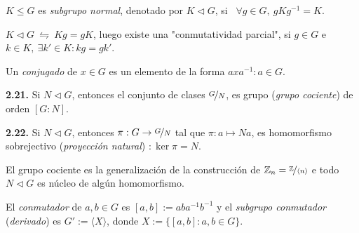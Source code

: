 \begin{definition}
    \(K\leq G\) es \emph{subgrupo normal}, denotado por \(K\lhd G\), si \ \(\forall g \in G, \ gKg^{-1} = K\).  
\end{definition}


\begin{note}
    \(K \lhd G \ \leftrightharpoons \ Kg = gK\), luego existe una "conmutatividad parcial", si \(g \in G\) e \(k \in K, \ \exists k' \in K : kg = gk'\). 
\end{note}

\begin{definition}
    Un \emph{conjugado} de \(x\in G\) es un elemento de la forma \(axa^{-1} : a \in G\). 
\end{definition}

\begin{theorem}
    \textbf{2.21.} Si \(N \lhd G\), entonces el conjunto de clases \(\nicefrac{G}{N}\), es grupo (\emph{grupo cociente}) de orden \([G:N]\). 
\end{theorem}

\begin{corollary}
    \textbf{2.22.} Si \(N \lhd G\), entonces \(\pi: G \to \nicefrac{G}{N}\) tal que \(\pi:  a\mapsto Na\), es homomorfismo sobrejectivo (\emph{proyección natural}) \(: \ker \pi = N\). 
\end{corollary}

\begin{note}
    El grupo cociente es la generalización de la construcción de \(\mathbb{Z}_n = \nicefrac{\mathbb{Z}}{\langle n \rangle}\) e todo \(N \lhd G\) es núcleo de algún homomorfismo.  
\end{note}

\begin{definition}
    El \emph{conmutador} de \(a,b \in G\) es \([a,b]:= aba^{-1}b^{-1}\) y el \emph{subgrupo conmutador} (\emph{derivado}) es \(G':= \langle X\rangle\), donde \(X :=\{ [a,b] : a,b \in G\}\). 
\end{definition}


